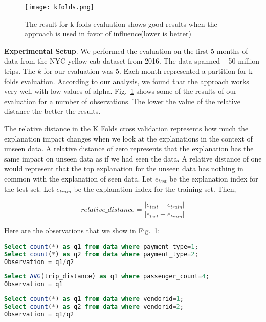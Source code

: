 \begin{figure}[h]
\texttt{[image: kfolds.png]}
\caption{The result for k-folds evaluation shows good results when the approach is used in favor of influence(lower is better)}
\label{fig:kfolds}
\end{figure}

\textbf{Experimental Setup}. We performed the evaluation on the first 5 months of data from the NYC yellow cab dataset from 2016. The data spanned ~ 50 million trips. The $k$ for our evaluation was $5$. Each month represented a partition for k-folds evaluation. According to our analysis, we found that the approach works very well with low values of alpha. Fig.~\ref{fig:kfolds} shows some of the results of our evaluation for a number of observations. The lower the value of the relative distance the better the results.

The relative distance in the K Folds cross validation represents how much the explanation impact changes when we look at the explanations in the context of unseen data. A relative distance of zero represents that the explanation has the same impact on unseen data as if we had seen the data. A relative distance of one would represent that the top explanation for the unseen data has nothing in common with the explanation of seen data. Let $e_{test}$ be the explanation index for the test set. Let $e_{train}$ be the explanation index for the training set. Then,

$$relative\_distance = \frac{|e_{test}-e_{train}|}{|e_{test}+e_{train}|}$$

Here are the observations that we show in Fig.~\ref{fig:kfolds}:
\renewcommand{\lstlistingname}{Query}%
\begin{lstlisting}[language=SQL, caption=o1 for Fig.~\ref{fig:kfolds}, label=qry:o1]
Select count(*) as q1 from data where payment_type=1;
Select count(*) as q2 from data where payment_type=2;
Observation = q1/q2
\end{lstlisting}

\begin{lstlisting}[language=SQL, caption=o2 for Fig.~\ref{fig:kfolds}, label=qry:o2]
Select AVG(trip_distance) as q1 where passenger_count=4;
Observation = q1
\end{lstlisting}

\begin{lstlisting}[language=SQL, caption=o3 for Fig.~\ref{fig:kfolds}, label=qry:o3]
Select count(*) as q1 from data where vendorid=1;
Select count(*) as q2 from data where vendorid=2;
Observation = q1/q2
\end{lstlisting}


